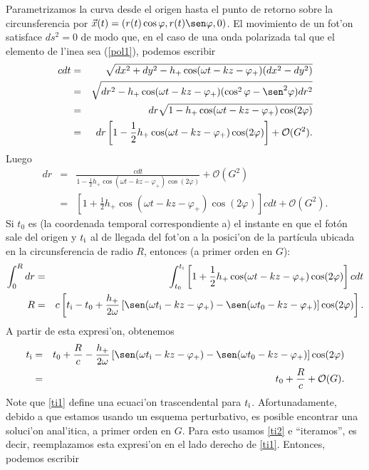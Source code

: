 Parametrizamos la curva desde el origen hasta el punto de retorno sobre la circunsferencia por $\vec{x}(t)=(r(t)\cos\varphi,r(t)\sen\varphi,0)$. El movimiento de un fot'on satisface $ds^2=0$ de modo que, en el caso de una onda polarizada tal que el elemento de l'inea sea (\ref{pol1}), podemos escribir
 \begin{eqnarray}
 cdt&=&\sqrt{dx^2+dy^2-h_+\cos(\omega t-kz-\varphi_+)(dx^2-dy^2)}\\
 &=&\sqrt{dr^2-h_+\cos(\omega t-kz-\varphi_+)(\cos^2\varphi-\sen^2\varphi)dr^2}\\
 &=&dr\sqrt{1-h_+\cos(\omega t-kz-\varphi_+)\cos(2\varphi)}\\
 &=&dr\left[1-\frac{1}{2}h_+\cos(\omega t-kz-\varphi_+)\cos(2\varphi)\right]+\mathcal{O}(G^2). \label{dr}
 \end{eqnarray}
Luego
\begin{eqnarray}
dr&=&\frac{cdt}{1-\frac{1}{2}h_+\cos(\omega t-kz-\varphi_+)\cos(2\varphi)}+\mathcal{O}(G^2)\\
&=&\left[1+\frac{1}{2}h_+\cos(\omega t-kz-\varphi_+)\cos(2\varphi) \right]cdt+\mathcal{O}(G^2).
\end{eqnarray}
Si $t_0$ es (la coordenada temporal correspondiente a) el instante en que el fot\'on sale del origen y $t_{\rm i}$ al de llegada del fot'on a la posici'on de la part\'icula ubicada en la circunsferencia de radio $R$, entonces (a primer orden en $G$):
\begin{eqnarray}
\int_{0}^{R}dr&=&\int_{t_0}^{t_{\rm i}}\left[1+\frac{1}{2}h_+\cos(\omega t-kz-\varphi_+)\cos(2\varphi) \right]cdt\\
R&=&c\left[t_{\rm i}-t_{0}+\frac{h_+}{2\omega}\left[\sen(\omega t_{\rm i}-kz-\varphi_+)-\sen(\omega t_0-kz-\varphi_+)\right]\cos(2\varphi) \right].
\end{eqnarray}
A partir de esta expresi'on, obtenemos
\begin{eqnarray}
t_{\rm i}&=&t_0+\frac{R}{c}-\frac{h_+}{2\omega}\left[\sen(\omega t_{\rm i}-kz-\varphi_+)-\sen(\omega t_0-kz-\varphi_+)\right]\cos(2\varphi) \label{ti1}\\
&=&t_0+\frac{R}{c}+\mathcal{O}(G). \label{ti2}
\end{eqnarray}
Note que \eqref{ti1} define una ecuaci'on trascendental para $t_{\rm i}$. Afortunadamente, debido a que estamos usando un esquema perturbativo, es posible encontrar una soluci'on anal'itica, a primer orden en $G$. Para esto usamos \eqref{ti2} e ``iteramos'', es decir, reemplazamos esta expresi'on en el lado derecho de \eqref{ti1}. Entonces, podemos escribir
